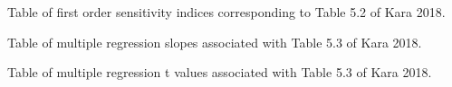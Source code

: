 \documentclass{article}
\begin{document}
\begin{table}[H]
\end{table}
\noindent Table of first order sensitivity indices corresponding to Table 5.2 of Kara 2018.

\begin{table}[H]
\end{table}
\noindent Table of multiple regression slopes associated with Table 5.3 of Kara 2018.

\begin{table}[H]
\end{table}
\noindent Table of multiple regression t values associated with Table 5.3 of Kara 2018.
\end{document}
